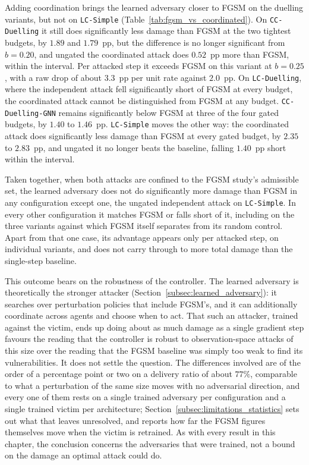 Adding coordination brings the learned adversary closer to FGSM on the duelling
variants, but not on \texttt{LC-Simple} (Table~\ref{tab:fgsm_vs_coordinated}). On
\texttt{CC-Duelling} it still does significantly less damage than FGSM at the two
tightest budgets, by $1.89$ and $1.79$~pp, but the difference is no longer significant
from $b = 0.20$, and ungated the coordinated attack does $0.52$~pp more than FGSM,
within the interval. Per attacked step it exceeds FGSM on this variant at $b = 0.25$,
with a raw drop of about $3.3$~pp per unit rate against $2.0$~pp. On
\texttt{LC-Duelling}, where the independent attack fell significantly short of FGSM at
every budget, the coordinated attack cannot be distinguished from FGSM at any budget.
\texttt{CC-Duelling-GNN} remains significantly below FGSM at three of the four gated
budgets, by $1.40$ to $1.46$~pp. \texttt{LC-Simple} moves the other way: the
coordinated attack does significantly less damage than FGSM at every gated budget, by
$2.35$ to $2.83$~pp, and ungated it no longer beats the baseline, falling $1.40$~pp
short within the interval.

Taken together, when both attacks are confined to the FGSM study's admissible set, the
learned adversary does not do significantly more damage than FGSM in any
configuration except one, the ungated independent attack on \texttt{LC-Simple}. In
every other configuration it matches FGSM or falls short of it, including on the three
variants against which FGSM itself separates from its random control. Apart from that
one case, its advantage appears only per attacked step, on individual variants, and
does not carry through to more total damage than the single-step baseline.

This outcome bears on the robustness of the controller. The learned adversary
is theoretically the stronger attacker (Section~\ref{subsec:learned_adversary}): it
searches over perturbation policies that include FGSM's, and it can additionally
coordinate across agents and choose when to act. That such an attacker, trained against
the victim, ends up doing about as much damage as a single gradient step favours the
reading that the controller is robust to observation-space attacks of this size over the
reading that the FGSM baseline was simply too weak to find its vulnerabilities. It does
not settle the question. The differences involved are of the order of a percentage point
or two on a delivery ratio of about $77\%$, comparable to what a perturbation of the same
size moves with no adversarial direction, and every one of them rests on a single trained
adversary per configuration and a single trained victim per architecture;
Section~\ref{subsec:limitations_statistics} sets out what that leaves unresolved, and
reports how far the FGSM figures themselves move when the victim is retrained. As with every result in this chapter, the conclusion concerns the
adversaries that were trained, not a bound on the damage an optimal attack could do.

